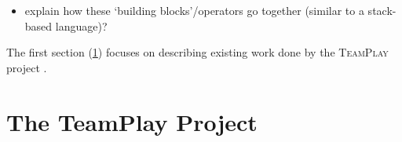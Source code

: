 \begin{itemize}
    \item explain how these `building blocks'/operators go together (similar to
    	  a stack-based language)?
\end{itemize}

The first section (\ref{des:tp-dsl}) focuses on describing existing work done by the \textsc{TeamPlay} project \cite{teamplay:d1.1}.


\section{The TeamPlay Project}\label{des:tp-dsl}
